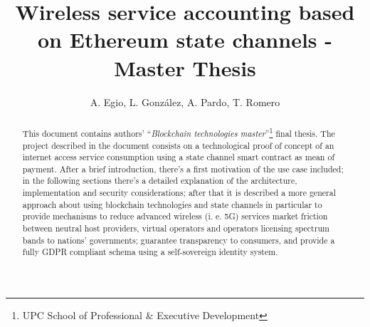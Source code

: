 \documentclass[12pt]{amsart}
\title{Wireless service accounting based on Ethereum state channels
- Master Thesis}
\author{
  A. Egio,
  L. González, A. Pardo, T. Romero
}
\begin{document}
\pagecolor{pagecolor}


\begin{abstract}
  \begin{center}
    This document contains authors' ``\textit{Blockchain
      technologies master}''\footnote{UPC School
      of Professional \& Executive Development}
    final thesis. The project described in the document
    consists on a technological proof
    of concept of an internet access service consumption
    using a state channel smart contract as
    mean of payment. After a brief
    introduction, there's a first motivation of
    the use case included;
    in the following sections
    there's a detailed explanation of
    the architecture, implementation and
    security considerations;
    after that it is described a more
    general approach about using blockchain technologies
    and state channels in particular to provide
    mechanisms to reduce advanced wireless
    (i. e. 5G) services market friction between neutral host
    providers, virtual operators and operators
    licensing spectrum bands to nations' governments;
    guarantee transparency to consumers,
    and provide a fully GDPR compliant
    schema using a self-sovereign identity system.
  \end{center}
\end{abstract}

\maketitle

\tableofcontents

\newpage
\end{document}
